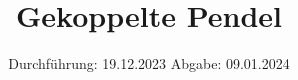 

\subject{V106}
\title{Gekoppelte Pendel}
\date{%
  Durchführung: 19.12.2023
  \hspace{3em}
  Abgabe: 09.01.2024
}



\maketitle
\thispagestyle{empty}
\tableofcontents
\newpage







\printbibliography{}



